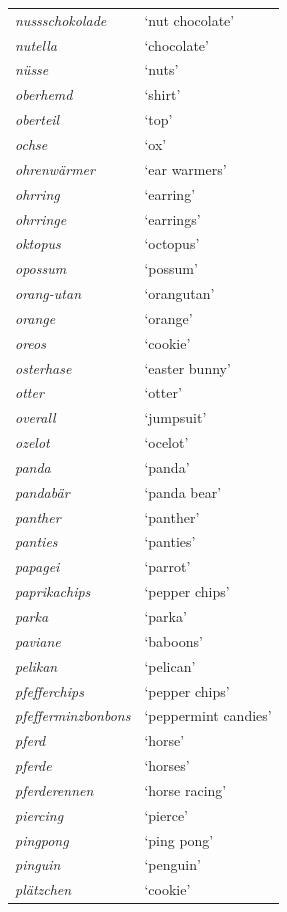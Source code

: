 \begin{longtable}{ll}
\textit{nussschokolade} & `nut chocolate' \\
\textit{nutella} & `chocolate' \\
\textit{nüsse} & `nuts' \\
\textit{oberhemd} & `shirt' \\
\textit{oberteil} & `top' \\
\textit{ochse} & `ox' \\
\textit{ohrenwärmer} & `ear warmers' \\
\textit{ohrring} & `earring' \\
\textit{ohrringe} & `earrings' \\
\textit{oktopus} & `octopus' \\
\textit{opossum} & `possum' \\
\textit{orang-utan} & `orangutan' \\
\textit{orange} & `orange' \\
\textit{oreos} & `cookie' \\
\textit{osterhase} & `easter bunny' \\
\textit{otter} & `otter' \\
\textit{overall} & `jumpsuit' \\
\textit{ozelot} & `ocelot' \\
\textit{panda} & `panda' \\
\textit{pandabär} & `panda bear' \\
\textit{panther} & `panther' \\
\textit{panties} & `panties' \\
\textit{papagei} & `parrot' \\
\textit{paprikachips} & `pepper chips' \\
\textit{parka} & `parka' \\
\textit{paviane} & `baboons' \\
\textit{pelikan} & `pelican' \\
\textit{pfefferchips} & `pepper chips' \\
\textit{pfefferminzbonbons} & `peppermint candies' \\
\textit{pferd} & `horse' \\
\textit{pferde} & `horses' \\
\textit{pferderennen} & `horse racing' \\
\textit{piercing} & `pierce' \\
\textit{pingpong} & `ping pong' \\
\textit{pinguin} & `penguin' \\
\textit{plätzchen} & `cookie' \\

\end{longtable}
